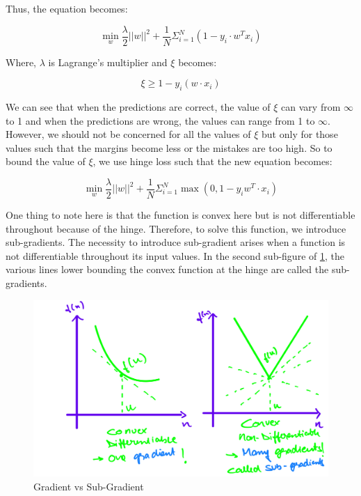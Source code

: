 \documentclass[11pt]{article}
\begin{document}
Thus, the equation becomes:

\begin{equation}
\min_{w}\dfrac{\lambda}{2}||w||^2+\dfrac{1}{N}\Sigma^N_{i=1}(1-y_i \cdot w^T x_i)
\end{equation}


Where, $\lambda$ is Lagrange's multiplier and $\xi$ becomes:

\begin{equation}
    \xi \geq 1-y_i(w \cdot x_i)
\end{equation}

We can see that when the predictions are correct, the value of $\xi$ can vary from $\infty$ to 1 and when the predictions are wrong, the values can range from 1 to $\infty$. However, we should not be concerned for all the values of $\xi$ but only for those values such that the margins become less or the mistakes are too high. So to bound the value of $\xi$, we use hinge loss such that the new equation becomes:

\begin{equation}
\min_{w}\dfrac{\lambda}{2}||w||^2+\dfrac{1}{N}\Sigma^N_{i=1}\max{(0, 1-y_i w^T \cdot x_i)}
\end{equation}

One thing to note here is that the function is convex here but is not differentiable throughout because of the hinge. Therefore, to solve this function, we introduce sub-gradients. The necessity to introduce sub-gradient arises when a function is not differentiable throughout its input values. In the second sub-figure of \ref{fig:GradientVsSubGradient}, the various lines lower bounding the convex function at the hinge are called the sub-gradients. 

\begin{figure}[H]
\begin{center}
\includegraphics[scale=0.25]{figures/diffNonDiff.PNG}
\end{center}
\caption{Gradient vs Sub-Gradient}
\label{fig:GradientVsSubGradient}
\end{figure}
\end{document}
